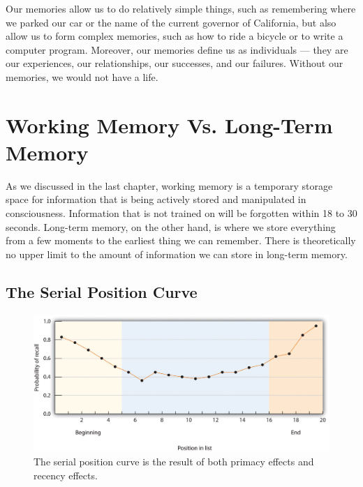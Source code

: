 \documentclass[
]{krantz}
\begin{document}
Our memories allow us to do relatively simple things, such as remembering where we parked our car or the name of the current governor of California, but also allow us to form complex memories, such as how to ride a bicycle or to write a computer program. Moreover, our memories define us as individuals --- they are our experiences, our relationships, our successes, and our failures. Without our memories, we would not have a life.

\hypertarget{working-memory-vs.-long-term-memory}{%
\section{Working Memory Vs. Long-Term Memory}\label{working-memory-vs.-long-term-memory}}

As we discussed in the last chapter, working memory is a temporary storage space for information that is being actively stored and manipulated in consciousness. Information that is not trained on will be forgotten within 18 to 30 seconds. Long-term memory, on the other hand, is where we store everything from a few moments to the earliest thing we can remember. There is theoretically no upper limit to the amount of information we can store in long-term memory.

\hypertarget{the-serial-position-curve}{%
\subsection*{The Serial Position Curve}\label{the-serial-position-curve}}


\begin{figure}

{\centering \includegraphics[width=0.8\linewidth]{images/ch5/fig1} 

}

\caption{The serial position curve is the result of both primacy effects and recency effects.}\label{fig:serialposition}
\end{figure}
\end{document}
